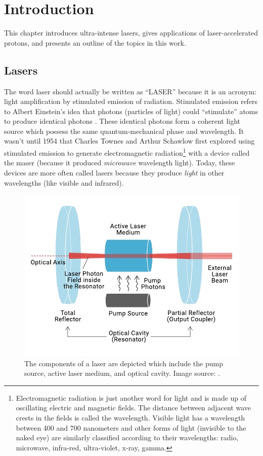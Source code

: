 \chapter{Introduction}
This chapter introduces ultra-intense lasers, gives applications of laser-accelerated protons, and presents an outline of the topics in this work.

\section{Lasers} \label{sec:lasers}

The word laser should actually be written as ``LASER'' because it is an acronym: light amplification by stimulated emission of radiation. Stimulated emission refers to Albert Einstein's idea that photons (particles of light) could ``stimulate'' atoms to produce identical photons \cite{Einstein_1917_Quantum}. These identical photons form a coherent light source which possess the same quantum-mechanical phase and wavelength. It wasn't until 1954 that Charles Townes and Arthur Schawlow first explored using stimulated emission to generate electromagnetic radiation\footnote{Electromagnetic radiation is just another word for light and is made up of oscillating electric and magnetic fields. The distance between adjacent wave crests in the fields is called the wavelength. Visible light has a wavelength between 400 and 700 nanometers and other forms of light (invisible to the naked eye) are similarly classified according to their wavelengths: radio, microwave, infra-red, ultra-violet, x-ray, gamma.} with a device called the maser (because it produced \emph{microwave} wavelength light). Today, these devices are more often called lasers because they produce \emph{light} in other wavelengths (like visible and infrared).


\begin{figure}
	\centering
	\includegraphics[width=0.75\linewidth]{planning/images/laser_gain.pdf}
	\caption{The components of a laser are depicted which include the pump source, active laser medium, and optical cavity. Image source: \cite{MeetOpticsPost}.}
	\label{fig:laser_gain}
\end{figure}

